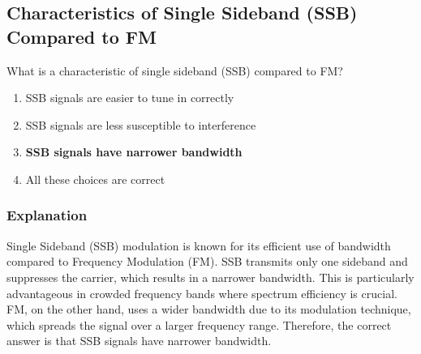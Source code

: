 \subsection{Characteristics of Single Sideband (SSB) Compared to FM}
\label{T8A07}

\begin{tcolorbox}[colback=gray!10!white,colframe=black!75!black,title=T8A07]
What is a characteristic of single sideband (SSB) compared to FM?
\begin{enumerate}[noitemsep]
    \item SSB signals are easier to tune in correctly
    \item SSB signals are less susceptible to interference
    \item \textbf{SSB signals have narrower bandwidth}
    \item All these choices are correct
\end{enumerate}
\end{tcolorbox}

\subsubsection*{Explanation}
Single Sideband (SSB) modulation is known for its efficient use of bandwidth compared to Frequency Modulation (FM). SSB transmits only one sideband and suppresses the carrier, which results in a narrower bandwidth. This is particularly advantageous in crowded frequency bands where spectrum efficiency is crucial. FM, on the other hand, uses a wider bandwidth due to its modulation technique, which spreads the signal over a larger frequency range. Therefore, the correct answer is that SSB signals have narrower bandwidth.